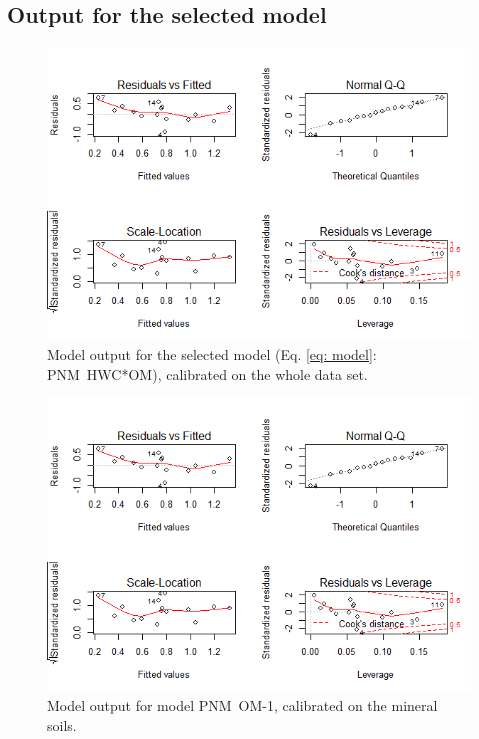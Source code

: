 \documentclass[10pt,twoside,dutch,english]{report}
\begin{document}
\begin{appendices}
\section{Output for the selected model}
\label{chap: modplots}
	\begin{figure}[H] %
    	\centering
		\includegraphics[width=0.85\linewidth]{appendix_modout_all}
		\caption{Model output for the selected model (Eq. \ref{eq: model}: PNM~HWC*OM), calibrated on the whole data set.}
		\end{figure}
		\begin{figure}[H] %
    	\centering
		\includegraphics[width=0.85\linewidth]{appendix_modout_min_om}
		\caption{Model output for model  PNM~OM-1, calibrated on the mineral soils.}
		\end{figure}
		\begin{figure}[H] %
    	\centering

\end{figure}
\end{appendices}
\end{document}
